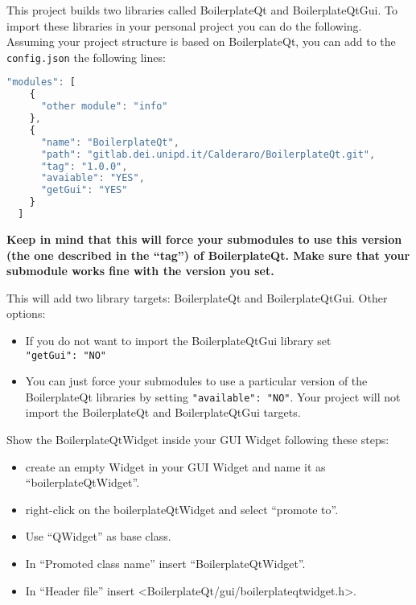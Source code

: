 
This project builds two libraries called BoilerplateQt and
BoilerplateQtGui. To import these libraries in your personal project you
can do the following. Assuming your project structure is based on
BoilerplateQt, you can add to the \texttt{config.json} the following
lines:

\begin{lstlisting}[language=javascript, gobble=2]
  "modules": [
    {
      "other module": "info"
    },
    {
      "name": "BoilerplateQt",
      "path": "gitlab.dei.unipd.it/Calderaro/BoilerplateQt.git",
      "tag": "1.0.0",
      "avaiable": "YES",
      "getGui": "YES"
    }
  ]
\end{lstlisting}

\textbf{Keep in mind that this will force your submodules to use this version (the one described in the ``tag'') of BoilerplateQt. Make sure that your submodule works fine with the version you set.}

This will add two library targets: BoilerplateQt and BoilerplateQtGui.
Other options:

\begin{itemize}
  \tightlist
  \item
        If you do not want to import the BoilerplateQtGui library set
        \texttt{"getGui":\ "NO"}
  \item
        You can just force your submodules to use a particular version of the
        BoilerplateQt libraries by setting \texttt{"available":\ "NO"}. Your
        project will not import the BoilerplateQt and BoilerplateQtGui
        targets.
\end{itemize}


Show the BoilerplateQtWidget inside your GUI Widget following these
steps:

\begin{itemize}
  \tightlist
  \item
        create an empty Widget in your GUI Widget and name it as
        ``boilerplateQtWidget''.
  \item
        right-click on the boilerplateQtWidget and select ``promote to''.
  \item
        Use ``QWidget'' as base class.
  \item
        In ``Promoted class name'' insert ``BoilerplateQtWidget''.
  \item
        In ``Header file'' insert
        \textless BoilerplateQt/gui/boilerplateqtwidget.h\textgreater.
\end{itemize}


